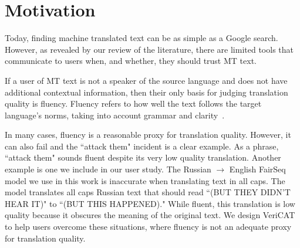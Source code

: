 
\section{Motivation}
\label{sec:design_requirements}

Today, finding machine translated text can be as simple as a Google search. However, as revealed by our review of the literature, there are limited tools that communicate to users when, and whether, they should trust MT text.  


If a user of MT text is not a speaker of the source language and does not have additional contextual information, then their only basis for judging translation quality is fluency. Fluency refers to how well the text follows the target language's norms, taking into account grammar and clarity~\cite{mauvcec2019machine}.  

In many cases, fluency is a reasonable proxy for translation quality. However, it can also fail and the ``attack them" incident is a clear example. As a phrase, ``attack them" sounds fluent despite its very low quality translation. Another example is one we include in our user study. The Russian $\rightarrow$ English FairSeq model we use in this work is inaccurate when translating text in all caps. The model translates all caps Russian text that should read ``(BUT THEY DIDN'T HEAR IT)" to ``(BUT THIS HAPPENED)." While fluent, this translation is low quality because it obscures the meaning of the original text. We design VeriCAT to help users overcome these situations, where fluency is not an adequate proxy for translation quality.


